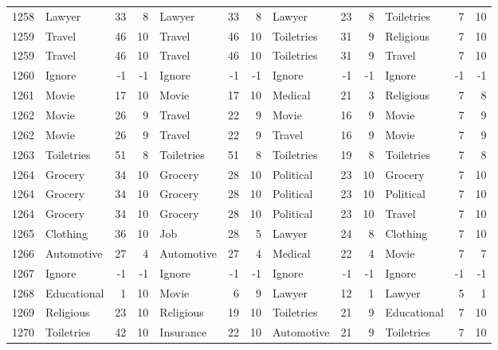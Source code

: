 \begin{figure}[htbp]
\begin{tabular}{rlrrlrrlrrlrr}
    1258  & Lawyer & 33    & 8     & Lawyer & 33    & 8     & Lawyer & 23    & 8     & Toiletries & 7     & 10 \\
    1259  & Travel & 46    & 10    & Travel & 46    & 10    & Toiletries & 31    & 9     & Religious & 7     & 10 \\
    1259  & Travel & 46    & 10    & Travel & 46    & 10    & Toiletries & 31    & 9     & Travel & 7     & 10 \\
    1260  & Ignore & -1    & -1    & Ignore & -1    & -1    & Ignore & -1    & -1    & Ignore & -1    & -1 \\
    1261  & Movie & 17    & 10    & Movie & 17    & 10    & Medical & 21    & 3     & Religious & 7     & 8 \\
    1262  & Movie & 26    & 9     & Travel & 22    & 9     & Movie & 16    & 9     & Movie & 7     & 9 \\
    1262  & Movie & 26    & 9     & Travel & 22    & 9     & Travel & 16    & 9     & Movie & 7     & 9 \\
    1263  & Toiletries & 51    & 8     & Toiletries & 51    & 8     & Toiletries & 19    & 8     & Toiletries & 7     & 8 \\
    1264  & Grocery & 34    & 10    & Grocery & 28    & 10    & Political & 23    & 10    & Grocery & 7     & 10 \\
    1264  & Grocery & 34    & 10    & Grocery & 28    & 10    & Political & 23    & 10    & Political & 7     & 10 \\
    1264  & Grocery & 34    & 10    & Grocery & 28    & 10    & Political & 23    & 10    & Travel & 7     & 10 \\
    1265  & Clothing & 36    & 10    & Job   & 28    & 5     & Lawyer & 24    & 8     & Clothing & 7     & 10 \\
    1266  & Automotive & 27    & 4     & Automotive & 27    & 4     & Medical & 22    & 4     & Movie & 7     & 7 \\
    1267  & Ignore & -1    & -1    & Ignore & -1    & -1    & Ignore & -1    & -1    & Ignore & -1    & -1 \\
    1268  & Educational & 1     & 10    & Movie & 6     & 9     & Lawyer & 12    & 1     & Lawyer & 5     & 1 \\
    1269  & Religious & 23    & 10    & Religious & 19    & 10    & Toiletries & 21    & 9     & Educational & 7     & 10 \\
    1270  & Toiletries & 42    & 10    & Insurance & 22    & 10    & Automotive & 21    & 9     & Toiletries & 7     & 10 \\

\end{tabular}
\end{figure}
